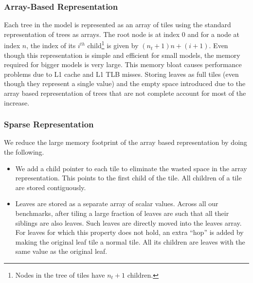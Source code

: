 \subsubsection{Array-Based Representation}
\label{sec:ArrayBased}
Each tree in the model is represented as an array of tiles using the standard representation of trees as arrays. The root node is 
at index 0 and for a node at index $n$, the index of its $i^{th}$ child\footnote{Nodes
in the tree of tiles have $n_t + 1$ children.} is given by $(n_t + 1) n + (i + 1)$.
Even though this representation is simple and efficient for small models, the memory required for bigger models is very large. 
This memory bloat causes performance problems due to L1 cache and L1 TLB misses.
Storing leaves as full tiles (even though they represent a single value) and the
empty space introduced due to the array based representation of trees that 
are not complete account for most of the increase.

\subsubsection{Sparse Representation}
\label{sec:SparseRep}
We reduce the large memory footprint of the array based representation by doing the following.

\begin{itemize}
  \item We add a child pointer to each tile to eliminate the wasted space in the array representation. This 
  points to the first child of the tile. All children of a tile are stored contiguously.
  \item Leaves are stored as a separate array of scalar values. Across all our benchmarks, after tiling a large fraction of 
  leaves are such that all their siblings are also leaves. Such leaves are directly moved into the leaves array. For leaves
  for which this property does not hold, an extra ``hop'' is added by making the original leaf tile a normal tile. All its
  children are leaves with the same value as the original leaf.
\end{itemize}

